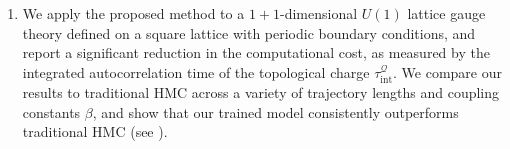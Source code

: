 \documentclass{article} %
\begin{document}
\begin{enumerate}
   \item We apply the proposed method to a \(1+1\)-dimensional \(U(1)\) lattice gauge theory defined on a
      square lattice with periodic boundary conditions, and report a significant reduction in the
      computational cost, as measured by the integrated autocorrelation time of the topological charge
      \(\tau_{\mathrm{int}}^{\mathcal{Q}}\).
      We compare our results to traditional HMC across a variety of trajectory lengths and coupling constants
      \(\beta\), and show that our trained model consistently outperforms traditional HMC (see
      ).
\end{enumerate}
%
\end{document}

